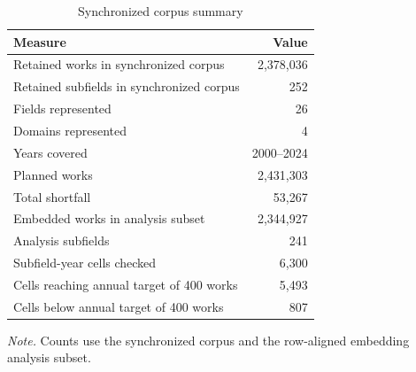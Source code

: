 \begin{table}[H]
\centering
\caption{Synchronized corpus summary}
\label{tab:corpus_summary}
\footnotesize
\begin{tabular}{p{} r}
\hline
\textbf{Measure} & \textbf{Value} \\
\hline
Retained works in synchronized corpus & 2,378,036 \\
Retained subfields in synchronized corpus & 252 \\
Fields represented & 26 \\
Domains represented & 4 \\
Years covered & 2000--2024 \\
Planned works & 2,431,303 \\
Total shortfall & 53,267 \\
Embedded works in analysis subset & 2,344,927 \\
Analysis subfields & 241 \\
Subfield-year cells checked & 6,300 \\
Cells reaching annual target of 400 works & 5,493 \\
Cells below annual target of 400 works & 807 \\
\hline
\end{tabular}
\par\vspace{0.2cm}
\footnotesize\textit{Note.} Counts use the synchronized corpus and the row-aligned embedding analysis subset.
\end{table}
